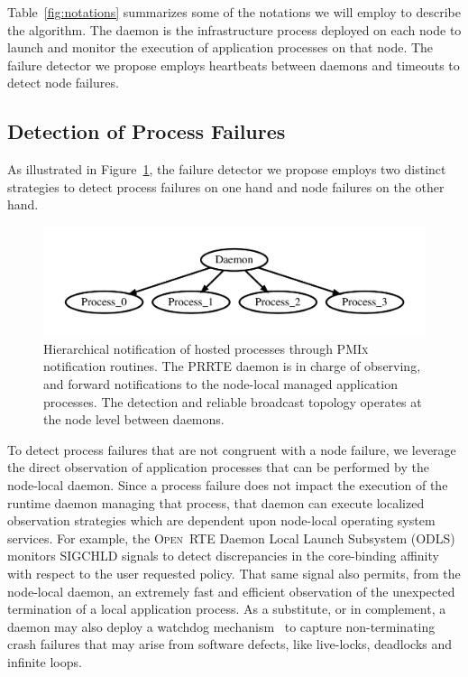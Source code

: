 \documentclass[sigconf]{acmart}
\newcommand{\prrte}[0]{\textsc{PRRTE}\xspace}
\newcommand{\pmix}[0]{\textsc{PMIx}\xspace}
\newcommand{\orte}[0]{\textsc{Open~RTE}\xspace}
\begin{document}
Table~\ref{fig:notations} summarizes some of the notations we will employ
to describe the algorithm. The daemon is the infrastructure
process deployed on each node to launch and monitor the execution of application
processes on that node. The failure detector we propose employs heartbeats
between daemons and timeouts to detect node failures.

\subsection{Detection of Process Failures}

As illustrated in Figure~\ref{fig:hosted}, the failure detector we propose
employs two distinct strategies to detect process failures on one hand
and node failures on the other hand.

\begin{figure}[h]
  \centering
  \includegraphics[width=\linewidth]{server_client.pdf}
  \caption{Hierarchical notification of hosted processes through \pmix notification routines. The \prrte daemon is in charge of observing, and forward notifications to the node-local managed application processes. The detection and reliable broadcast
  topology operates at the node level between daemons.}\label{fig:hosted}
\end{figure}

To detect process failures that are not congruent with a node failure, we
leverage the direct observation of application processes that can be
performed by the node-local daemon. Since a process failure does not
impact the execution of the runtime daemon managing that process, that
daemon can execute localized observation strategies which are dependent
upon node-local operating system services. For example, the \orte Daemon
Local Launch Subsystem (ODLS) monitors SIGCHLD signals to detect discrepancies
in the core-binding affinity with respect to the user requested policy.
That same signal also permits, from the node-local daemon, an extremely fast and efficient observation
of the unexpected termination of a local application process. As a substitute,
or in complement, a daemon may also deploy a watchdog mechanism~\cite{CASTAIN18}
to capture non-terminating crash failures that may arise from software
defects, like live-locks, deadlocks and infinite loops.
\end{document}
